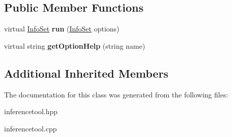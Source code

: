 \subsection*{Public Member Functions}
\begin{DoxyCompactItemize}
\item 
\hypertarget{classpct_1_1_inference_tool_ad0ed8739f52c7a8914a9fd1939b35e49}{virtual \hyperlink{classpct_1_1_info_set}{Info\-Set} {\bfseries run} (\hyperlink{classpct_1_1_info_set}{Info\-Set} options)}\label{classpct_1_1_inference_tool_ad0ed8739f52c7a8914a9fd1939b35e49}

\item 
\hypertarget{classpct_1_1_inference_tool_a6fe6b41458fd550575611156491ea203}{virtual string {\bfseries get\-Option\-Help} (string name)}\label{classpct_1_1_inference_tool_a6fe6b41458fd550575611156491ea203}

\end{DoxyCompactItemize}
\subsection*{Additional Inherited Members}


The documentation for this class was generated from the following files\-:\begin{DoxyCompactItemize}
\item 
inferencetool.\-hpp\item 
inferencetool.\-cpp\end{DoxyCompactItemize}
